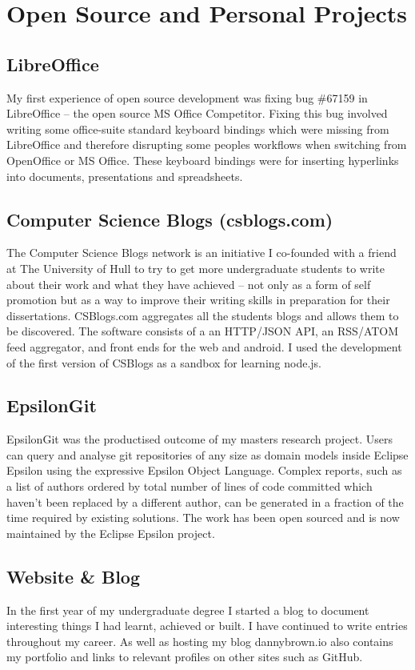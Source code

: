 \documentclass[10pt,letterpaper]{article}
\begin{document}
	\section*{Open Source and Personal Projects}
	\subsection*{LibreOffice}
	My first experience of open source development was fixing bug \#67159 in LibreOffice -- the open source MS Office Competitor. Fixing this bug involved writing some office-suite standard keyboard bindings which were missing from LibreOffice and therefore disrupting some peoples workflows when switching from OpenOffice or MS Office. These keyboard bindings were for inserting hyperlinks into documents, presentations and spreadsheets.
	\subsection*{Computer Science Blogs \small{(csblogs.com)}}
	The Computer Science Blogs network is an initiative I co-founded with a friend at The University of Hull to try to get more undergraduate students to write about their work and what they have achieved -- not only as a form of self promotion but as a way to improve their writing skills in preparation for their dissertations. CSBlogs.com aggregates all the students blogs and allows them to be discovered. The software consists of a an HTTP/JSON API, an RSS/ATOM feed aggregator, and front ends for the web and android. I used the development of the first version of CSBlogs as a sandbox for learning node.js.
	
	\subsection*{EpsilonGit}
	EpsilonGit was the productised outcome of my masters research project. Users can query and analyse git repositories of any size as domain models inside Eclipse Epsilon using the expressive Epsilon Object Language. Complex reports, such as a list of authors ordered by total number of lines of code committed which haven’t been replaced by a different author, can be generated in a fraction of the time required by existing solutions. The work has been open sourced and is now maintained by the Eclipse Epsilon project. 

	\subsection*{Website \& Blog}
	In the first year of my undergraduate degree I started a blog to document interesting things I had learnt, achieved or built. I have continued to write entries throughout my career. As well as hosting my blog dannybrown.io also contains my portfolio and links to relevant profiles on other sites such as GitHub.
	
\end{document}
